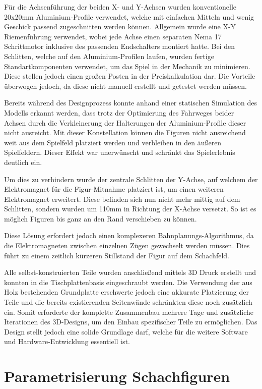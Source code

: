 Für die Achsenführung der beiden X- und Y-Achsen wurden konventionelle
20x20mm Aluminium-Profile verwendet, welche mit einfachen Mitteln und
wenig Geschick passend zugeschnitten werden können. Allgemein wurde eine
X-Y Riemenführung verwendet, wobei jede Achse einen separaten Nema 17
Schrittmotor inklusive des passenden Endschalters montiert hatte. Bei
den Schlitten, welche auf den Aluminium-Profilen laufen, wurden fertige
Standartkomponenten verwendet, um das Spiel in der Mechanik zu
minimieren. Diese stellen jedoch einen großen Posten in der
Preiskalkulation dar. Die Vorteile überwogen jedoch, da diese nicht
manuell erstellt und getestet werden müssen.

Bereits während des Designprozess konnte anhand einer statischen
Simulation des Modells erkannt werden, dass trotz der Optimierung des
Fahrweges beider Achsen durch die Verkleinerung der Halterungen der
Aluminium-Profile dieser nicht ausreicht. Mit dieser Konstellation
können die Figuren nicht ausreichend weit aus dem Spielfeld platziert
werden und verbleiben in den äußeren Spielfeldern. Dieser Effekt war
unerwünscht und schränkt das Spielerlebnis deutlich ein.

Um dies zu verhindern wurde der zentrale Schlitten der Y-Achse, auf
welchem der Elektromagnet für die Figur-Mitnahme platziert ist, um einen
weiteren Elektromagnet erweitert. Diese befinden sich nun nicht mehr
mittig auf dem Schlitten, sondern wurden um 110mm in Richtung der
X-Achse versetzt. So ist es möglich Figuren bis ganz an den Rand
verschieben zu können.

Diese Lösung erfordert jedoch einen komplexeren
Bahnplanungs-Algorithmus, da die Elektromagneten zwischen einzelnen
Zügen gewechselt werden müssen. Dies führt zu einem zeitlich kürzeren
Stillstand der Figur auf dem Schachfeld.

Alle selbst-konstruierten Teile wurden anschließend mittels 3D Druck
erstellt und konnten in die Tischplattenbasis eingeschraubt werden. Die
Verwendung der aus Holz bestehenden Grundplatte erschwerte jedoch eine
akkurate Platzierung der Teile und die bereits existierenden Seitenwände
schränkten diese noch zusätzlich ein. Somit erforderte der komplette
Zusammenbau mehrere Tage und zusätzliche Iterationen des 3D-Designs, um
den Einbau spezifischer Teile zu ermöglichen. Das Design stellt jedoch
eine solide Grundlage darf, welche für die weitere Software und
Hardware-Entwicklung essentiell ist.

\hypertarget{parametrisierung-schachfiguren}{%
\section{Parametrisierung
Schachfiguren}\label{parametrisierung-schachfiguren}}

